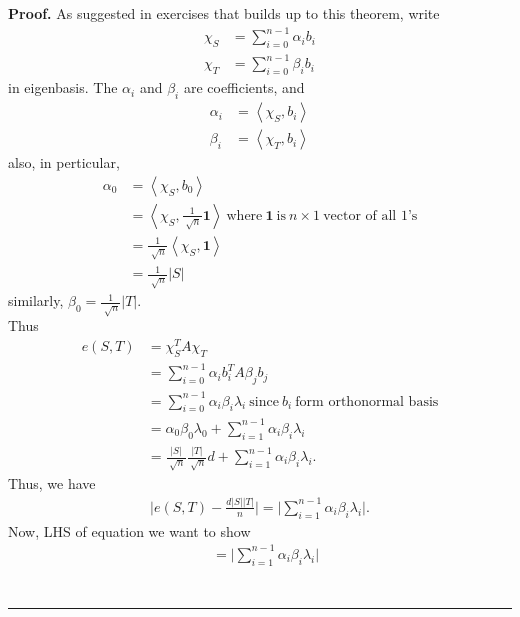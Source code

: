 \documentclass[12pt]{article}%
\newenvironment{proof}[1][Proof]{\textbf{#1.} }{\ \rule{0.5em}{0.5em}}
\begin{document}
\begin{proof}
    As suggested in exercises that builds up to this theorem, 
    write
    \begin{align}
        \chi_S &= \sum_{i=0}^{n-1} \alpha_i b_i \\
        \chi_T &= \sum_{i=0}^{n-1} \beta_i b_i 
    \end{align}
    in eigenbasis. The $\alpha_i$ and $\beta_i$ are coefficients, and 
    \begin{align}
        \alpha_i &= \left\langle \chi_S, b_i \right\rangle\\
        \beta_i &= \left\langle \chi_T, b_i \right\rangle 
    \end{align}
    also, in perticular, 
    \begin{align}
        \alpha_0 &= \left\langle \chi_S, b_0 \right\rangle\\
        &= \left\langle \chi_S, \frac{ 1 }{ \sqrt[]{n} } \mathbf{1} \right\rangle \ \text{where} \ \mathbf{1} \ \text{is} \ n \times 1 \ \text{vector of all 1's}\\
        &= \frac{ 1 }{ \sqrt[]{n} } \left\langle \chi_S, \mathbf{1} \right\rangle \\
        &= \frac{ 1 }{ \sqrt[]{n} } \lvert S \rvert
    \end{align}
    similarly, $\beta_0 = \frac{ 1 }{ \sqrt[]{n} } \lvert T\rvert$.\\
    Thus 
    \begin{align}
    e (S,T) &= \chi_S^T A \chi_T\\
    &= \sum_{i=0}^{n-1} \alpha_i b_i^T A \beta_j b_j\\
    &= \sum_{i=0}^{n-1} \alpha_i \beta_i \lambda_i \ \text{since} \ b_i \ \text{form orthonormal basis}\\
    &= \alpha_0 \beta_0 \lambda_0 + \sum_{i=1}^{n-1} \alpha_i \beta_i \lambda_i\\
    &= \frac{ \lvert S \rvert }{ \sqrt[]{n} } \frac{ \lvert T \rvert }{ \sqrt[]{n} } d +  \sum_{i=1}^{n-1} \alpha_i \beta_i \lambda_i.
    \end{align}
    Thus, we have
    \begin{align}
        \lvert e(S,T) - \frac{ d \lvert S\rvert \lvert T\rvert }{ n }\rvert = \lvert \sum_{i=1}^{n-1} \alpha_i \beta_i \lambda_i \rvert.
    \end{align}
    Now, LHS of equation we want to show
    \begin{align}
        &= \lvert \sum_{i=1}^{n-1} \alpha_i \beta_i \lambda_i \rvert\\

\end{align}
\end{proof}
\end{document}
